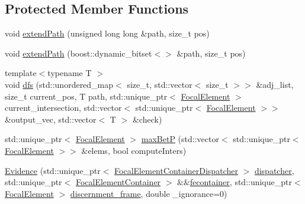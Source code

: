 \subsection*{Protected Member Functions}
\begin{DoxyCompactItemize}
\item 
void \hyperlink{classEvidence_a5396b2087d6353fb4b2bc2976db93174}{extend\+Path} (unsigned long long \&path, size\+\_\+t pos)
\item 
void \hyperlink{classEvidence_aa3d0e63bb1be45a646f6443186298ed7}{extend\+Path} (boost\+::dynamic\+\_\+bitset$<$$>$ \&path, size\+\_\+t pos)
\item 
{\footnotesize template$<$typename T $>$ }\\void \hyperlink{classEvidence_a33d81e2a221474b3547da413d48161ca}{dfs} (std\+::unordered\+\_\+map$<$ size\+\_\+t, std\+::vector$<$ size\+\_\+t $>$$>$ \&adj\+\_\+list, size\+\_\+t current\+\_\+pos, T path, std\+::unique\+\_\+ptr$<$ \hyperlink{classFocalElement}{Focal\+Element} $>$ current\+\_\+intersection, std\+::vector$<$ std\+::unique\+\_\+ptr$<$ \hyperlink{classFocalElement}{Focal\+Element} $>$$>$ \&output\+\_\+vec, std\+::vector$<$ T $>$ \&check)
\item 
std\+::unique\+\_\+ptr$<$ \hyperlink{classFocalElement}{Focal\+Element} $>$ \hyperlink{classEvidence_acff22e57c3c79f40ad47f5e10f96d81c}{max\+Bet\+P} (std\+::vector$<$ std\+::unique\+\_\+ptr$<$ \hyperlink{classFocalElement}{Focal\+Element} $>$$>$ \&elems, bool compute\+Inters)
\item 
\hyperlink{classEvidence_a8136cd1d58c59e4b6a5088e9ac581797}{Evidence} (std\+::unique\+\_\+ptr$<$ \hyperlink{classFocalElementContainerDispatcher}{Focal\+Element\+Container\+Dispatcher} $>$ \hyperlink{classEvidence_a8ae2742750940957698135fd9014d6d4}{dispatcher}, std\+::unique\+\_\+ptr$<$ \hyperlink{classFocalElementContainer}{Focal\+Element\+Container} $>$ \&\&\hyperlink{classEvidence_a1476adbcd8bc99817cc77b338b50cdef}{fecontainer}, std\+::unique\+\_\+ptr$<$ \hyperlink{classFocalElement}{Focal\+Element} $>$ \hyperlink{classEvidence_a4564fa5d7963b912d66549ac33d86dfd}{discernment\+\_\+frame}, double \+\_\+ignorance=0)
\end{DoxyCompactItemize}
